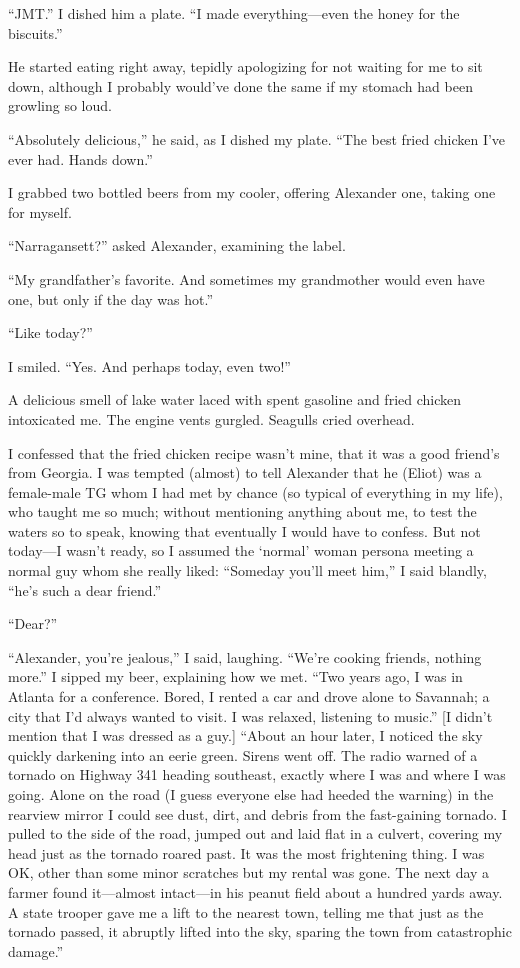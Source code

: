 ``JMT.'' I dished him a plate. ``I made everything---even the honey for
the biscuits.''

He started eating right away, tepidly apologizing for not waiting for me
to sit down, although I probably would've done the same if my stomach
had been growling so loud.

``Absolutely delicious,'' he said, as I dished my plate. ``The best
fried chicken I've ever had. Hands down.''

I grabbed two bottled beers from my cooler, offering Alexander one,
taking one for myself.

``Narragansett?'' asked Alexander, examining the label.

``My grandfather's favorite. And sometimes my grandmother would even
have one, but only if the day was hot.''

``Like today?''

I smiled. ``Yes. And perhaps today, even two!''

A delicious smell of lake water laced with spent gasoline and fried
chicken intoxicated me. The engine vents gurgled. Seagulls cried
overhead.

I confessed that the fried chicken recipe wasn't mine, that it was a
good friend's from Georgia. I was tempted (almost) to tell Alexander
that he (Eliot) was a female-male TG whom I had met by chance (so
typical of everything in my life), who taught me so much; without
mentioning anything about me, to test the waters so to speak, knowing
that eventually I would have to confess. But not today---I wasn't ready,
so I assumed the `normal' woman persona meeting a normal guy whom she
really liked: ``Someday you'll meet him,'' I said blandly, ``he's such a
dear friend.''

``Dear?''

``Alexander, you're jealous,'' I said, laughing. ``We're cooking
friends, nothing more.'' I sipped my beer, explaining how we met. ``Two
years ago, I was in Atlanta for a conference. Bored, I rented a car and
drove alone to Savannah; a city that I'd always wanted to visit. I was
relaxed, listening to music.'' {[}I didn't mention that I was dressed as
a guy.{]} ``About an hour later, I noticed the sky quickly darkening
into an eerie green. Sirens went off. The radio warned of a tornado on
Highway 341 heading southeast, exactly where I was and where I was
going. Alone on the road (I guess everyone else had heeded the warning)
in the rearview mirror I could see dust, dirt, and debris from the
fast-gaining tornado. I pulled to the side of the road, jumped out and
laid flat in a culvert, covering my head just as the tornado roared
past. It was the most frightening thing. I was OK, other than some minor
scratches but my rental was gone. The next day a farmer found
it---almost intact---in his peanut field about a hundred yards away. A
state trooper gave me a lift to the nearest town, telling me that just
as the tornado passed, it abruptly lifted into the sky, sparing the town
from catastrophic damage.''

